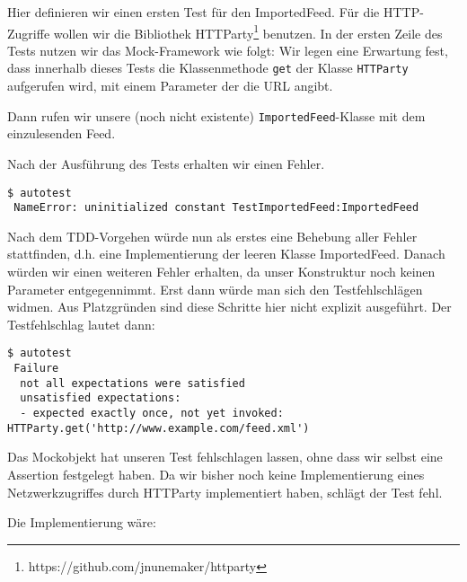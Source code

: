 Hier definieren wir einen ersten Test für den ImportedFeed. Für die HTTP-Zugriffe wollen wir die Bibliothek HTTParty\footnote{https://github.com/jnunemaker/httparty} benutzen. In der ersten Zeile des Tests nutzen wir das Mock-Framework wie folgt: Wir legen eine Erwartung fest, dass innerhalb dieses Tests die Klassenmethode \texttt{get} der Klasse \texttt{HTTParty} aufgerufen wird, mit einem Parameter der die URL angibt.

Dann rufen wir unsere (noch nicht existente) \texttt{ImportedFeed}-Klasse mit dem einzulesenden Feed.
\tddred

Nach der Ausführung des Tests erhalten wir einen Fehler.
\begin{lstlisting}[label={Ausführung des Tests -- Fehler}]
$ autotest
 NameError: uninitialized constant TestImportedFeed:ImportedFeed
\end{lstlisting}
Nach dem TDD-Vorgehen würde nun als erstes eine Behebung aller Fehler stattfinden, d.h. eine Implementierung der leeren Klasse ImportedFeed. Danach würden wir einen weiteren Fehler erhalten, da unser Konstruktur noch keinen Parameter entgegennimmt. Erst dann würde man sich den Testfehlschlägen widmen. Aus Platzgründen sind diese Schritte hier nicht explizit ausgeführt. Der Testfehlschlag lautet dann:

\begin{lstlisting}[label={Ausführung des Tests -- Fehlschlag durch Mock}]
$ autotest
 Failure
  not all expectations were satisfied
  unsatisfied expectations:
  - expected exactly once, not yet invoked: HTTParty.get('http://www.example.com/feed.xml')
\end{lstlisting}
Das Mockobjekt hat unseren Test fehlschlagen lassen, ohne dass wir selbst eine Assertion festgelegt haben. Da wir bisher noch keine Implementierung eines Netzwerkzugriffes durch HTTParty implementiert haben, schlägt der Test fehl.

Die Implementierung wäre:
\begin{ruby}[label=lib/imported\_feed.rb]
 

 
   
\end{ruby}


